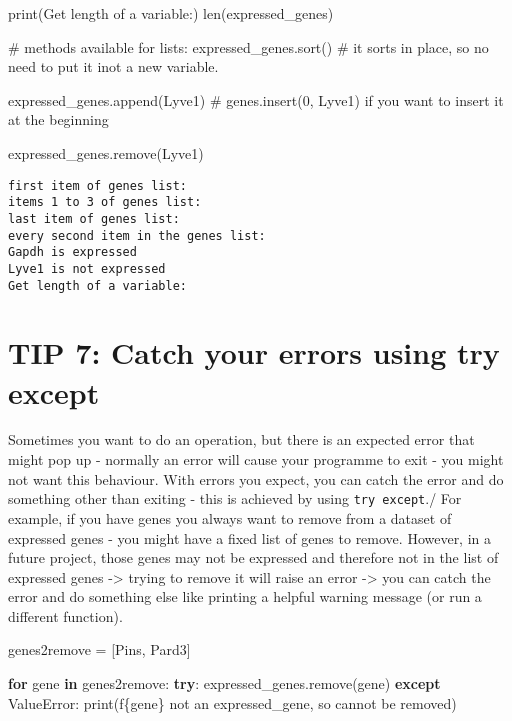\documentclass[
  letterpaper,
  DIV=11,
  numbers=noendperiod]{scrartcl}
\newenvironment{Shaded}{\begin{snugshade}}{\end{snugshade}}
\newcommand{\BuiltInTok}[1]{\textcolor[rgb]{0.00,0.23,0.31}{#1}}
\newcommand{\CommentTok}[1]{\textcolor[rgb]{0.37,0.37,0.37}{#1}}
\newcommand{\ControlFlowTok}[1]{\textcolor[rgb]{0.00,0.23,0.31}{\textbf{#1}}}
\newcommand{\KeywordTok}[1]{\textcolor[rgb]{0.00,0.23,0.31}{\textbf{#1}}}
\newcommand{\NormalTok}[1]{\textcolor[rgb]{0.00,0.23,0.31}{#1}}
\newcommand{\OperatorTok}[1]{\textcolor[rgb]{0.37,0.37,0.37}{#1}}
\newcommand{\PreprocessorTok}[1]{\textcolor[rgb]{0.68,0.00,0.00}{#1}}
\newcommand{\SpecialCharTok}[1]{\textcolor[rgb]{0.37,0.37,0.37}{#1}}
\newcommand{\SpecialStringTok}[1]{\textcolor[rgb]{0.13,0.47,0.30}{#1}}
\newcommand{\StringTok}[1]{\textcolor[rgb]{0.13,0.47,0.30}{#1}}
\begin{document}
\begin{Shaded}
\begin{Highlighting}[]
\BuiltInTok{print}\NormalTok{(}\StringTok{\textquotesingle{}Get length of a variable:\textquotesingle{}}\NormalTok{)}
\BuiltInTok{len}\NormalTok{(expressed\_genes)}

\CommentTok{\# methods available for lists:}
\NormalTok{expressed\_genes.sort() }\CommentTok{\# it sorts in place, so no need to put it inot a new variable.}

\NormalTok{expressed\_genes.append(}\StringTok{\textquotesingle{}Lyve1\textquotesingle{}}\NormalTok{) }\CommentTok{\# genes.insert(0, \textquotesingle{}Lyve1\textquotesingle{}) if you want to insert it at the beginning}

\NormalTok{expressed\_genes.remove(}\StringTok{\textquotesingle{}Lyve1\textquotesingle{}}\NormalTok{)}
\end{Highlighting}
\end{Shaded}

\begin{verbatim}
first item of genes list:
items 1 to 3 of genes list:
last item of genes list:
every second item in the genes list:
Gapdh is expressed
Lyve1 is not expressed
Get length of a variable:
\end{verbatim}

\section{TIP 7: Catch your errors using try
except}\label{tip-7-catch-your-errors-using-try-except}

Sometimes you want to do an operation, but there is an expected error
that might pop up - normally an error will cause your programme to exit
- you might not want this behaviour. With errors you expect, you can
catch the error and do something other than exiting - this is achieved
by using \texttt{try\ except}./ For example, if you have genes you
always want to remove from a dataset of expressed genes - you might have
a fixed list of genes to remove. However, in a future project, those
genes may not be expressed and therefore not in the list of expressed
genes -\textgreater{} trying to remove it will raise an error
-\textgreater{} you can catch the error and do something else like
printing a helpful warning message (or run a different function).

\begin{Shaded}
\begin{Highlighting}[]
\NormalTok{genes2remove }\OperatorTok{=}\NormalTok{ [}\StringTok{\textquotesingle{}Pins\textquotesingle{}}\NormalTok{, }\StringTok{\textquotesingle{}Pard3\textquotesingle{}}\NormalTok{]}


\ControlFlowTok{for}\NormalTok{ gene }\KeywordTok{in}\NormalTok{ genes2remove:}
    \ControlFlowTok{try}\NormalTok{:}
\NormalTok{        expressed\_genes.remove(gene)}
    \ControlFlowTok{except} \PreprocessorTok{ValueError}\NormalTok{:}
        \BuiltInTok{print}\NormalTok{(}\SpecialStringTok{f\textquotesingle{}}\SpecialCharTok{\{}\NormalTok{gene}\SpecialCharTok{\}}\SpecialStringTok{ not an expressed\_gene, so cannot be removed\textquotesingle{}}\NormalTok{)}
\end{Highlighting}
\end{Shaded}
\end{document}
